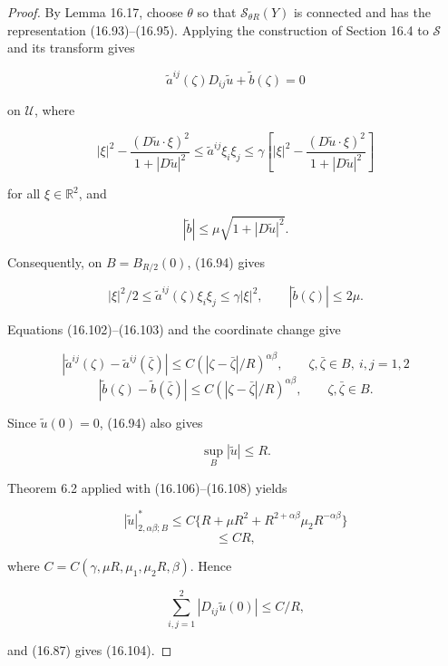 \begin{proof}
\sketch By Lemma 16.17, choose $\theta$ so that $\mathcal S_{\theta R}(Y)$ is
connected and has the representation (16.93)--(16.95). Applying the construction
of Section 16.4 to $\mathcal S$ and its transform gives

\begin{equation}
\tilde a^{ij}(\zeta)D_{ij}\tilde u+\tilde b(\zeta)=0
\tag{16.105}
\end{equation}



on $\mathcal U$, where

\[
|\xi|^2-\frac{(D\tilde u\cdot \xi)^2}{1+|D\tilde u|^2}
\leq \tilde a^{ij}\xi_i\xi_j
\leq \gamma\left[|\xi|^2-\frac{(D\tilde u\cdot \xi)^2}{1+|D\tilde u|^2}\right]
\]

for all $\xi\in \mathbb R^2$, and

\[
|\tilde b|\leq \mu\sqrt{1+|D\tilde u|^2}.
\]

Consequently, on $B=B_{R/2}(0)$, (16.94) gives

\begin{equation}\tag{16.106}
|\xi|^2/2\leq \tilde a^{ij}(\zeta)\xi_i\xi_j\leq \gamma|\xi|^2,
\qquad
|\tilde b(\zeta)|\leq 2\mu.
\end{equation}

Equations (16.102)--(16.103) and the coordinate change give

\begin{equation}\tag{16.107}
\left|\tilde a^{ij}(\zeta)-\tilde a^{ij}(\bar\zeta)\right|
\leq C(|\zeta-\bar\zeta|/R)^{\alpha\beta},
\qquad \zeta,\bar\zeta\in B,\ i,j=1,2
\end{equation}
\[
\left|\tilde b(\zeta)-\tilde b(\bar\zeta)\right|
\leq C(|\zeta-\bar\zeta|/R)^{\alpha\beta},
\qquad \zeta,\bar\zeta\in B.
\]

Since $\tilde u(0)=0$, (16.94) also gives

\begin{equation}\tag{16.108}
\sup_B |\tilde u|\leq R.
\end{equation}

Theorem 6.2 applied with (16.106)--(16.108) yields

\[
|\tilde u|_{2,\alpha\beta;B}^*\leq C\{R+\mu R^2+R^{2+\alpha\beta}\mu_2R^{-\alpha\beta}\}
\]
\[
\leq CR,
\]

where $C=C(\gamma,\mu R,\mu_1,\mu_2R,\beta)$. Hence

\[
\sum_{i,j=1}^2 |D_{ij}\tilde u(0)|\leq C/R,
\]

and (16.87) gives (16.104).
\end{proof}

